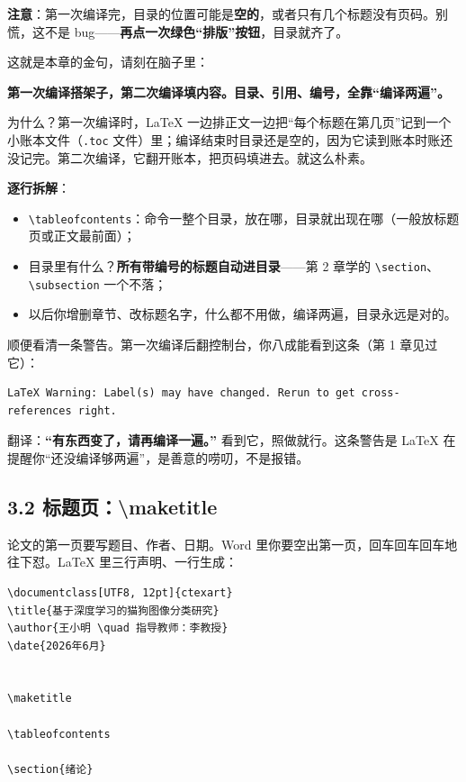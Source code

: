 \textbf{注意}：第一次编译完，目录的位置可能是\textbf{空的}，或者只有几个标题没有页码。别慌，这不是 bug——\textbf{再点一次绿色“排版”按钮}，目录就齐了。

这就是本章的金句，请刻在脑子里：

\begin{notebox}
\textbf{第一次编译搭架子，第二次编译填内容。目录、引用、编号，全靠“编译两遍”。}
\end{notebox}

为什么？第一次编译时，LaTeX 一边排正文一边把“每个标题在第几页”记到一个小账本文件（\texttt{.toc} 文件）里；编译结束时目录还是空的，因为它读到账本时账还没记完。第二次编译，它翻开账本，把页码填进去。就这么朴素。

\textbf{逐行拆解}：

\begin{itemize}
\setlength{\itemsep}{2pt}
\item \texttt{\textbackslash{}tableofcontents}：命令一整个目录，放在哪，目录就出现在哪（一般放标题页或正文最前面）；
\item 目录里有什么？\textbf{所有带编号的标题自动进目录}——第 2 章学的 \texttt{\textbackslash{}section}、\texttt{\textbackslash{}subsection} 一个不落；
\item 以后你增删章节、改标题名字，什么都不用做，编译两遍，目录永远是对的。
\end{itemize}

顺便看清一条警告。第一次编译后翻控制台，你八成能看到这条（第 1 章见过它）：

\begin{lstlisting}
LaTeX Warning: Label(s) may have changed. Rerun to get cross-references right.
\end{lstlisting}

翻译：\textbf{“有东西变了，请再编译一遍。”} 看到它，照做就行。这条警告是 LaTeX 在提醒你“还没编译够两遍”，是善意的唠叨，不是报错。

\subsection*{3.2 标题页：\textbackslash{}maketitle}

论文的第一页要写题目、作者、日期。Word 里你要空出第一页，回车回车回车地往下怼。LaTeX 里三行声明、一行生成：

\begin{lstlisting}
\documentclass[UTF8, 12pt]{ctexart}
\title{基于深度学习的猫狗图像分类研究}
\author{王小明 \quad 指导教师：李教授}
\date{2026年6月}


\maketitle

\tableofcontents

\section{绪论}


\end{lstlisting}

